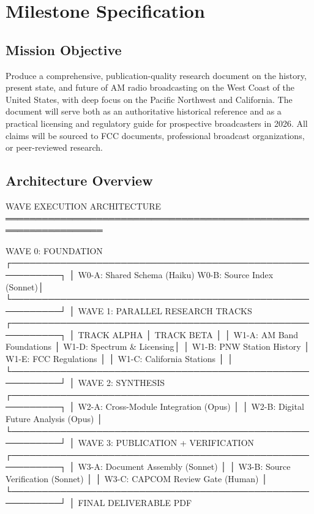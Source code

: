 \documentclass[11pt,letterpaper]{article}
\newcommand{\stageheader}[2]{%
  \noindent\colorbox{#2}{\makebox[\textwidth][l]{%
    \textcolor{white}{\bfseries\sffamily\hspace{6pt}#1\hspace{6pt}}}}%
  \vspace{0.5em}\par%
}
\begin{document}
\begin{asciibox}
\newpage

\stageheader{STAGE 3 --- MISSION PACKAGE}{tertiary}

\section{Milestone Specification}

\subsection{Mission Objective}

Produce a comprehensive, publication-quality research document on the history, present state,
and future of AM radio broadcasting on the West Coast of the United States, with deep focus on
the Pacific Northwest and California. The document will serve both as an authoritative historical
reference and as a practical licensing and regulatory guide for prospective broadcasters in 2026.
All claims will be sourced to FCC documents, professional broadcast organizations, or peer-reviewed
research.

\subsection{Architecture Overview}

\begin{asciibox}
WAVE EXECUTION ARCHITECTURE
══════════════════════════════════════════════════════════════════

  WAVE 0: FOUNDATION
  ┌──────────────────────────────────────────────────────────┐
  │  W0-A: Shared Schema (Haiku)   W0-B: Source Index (Sonnet)│
  └──────────────────────────────────────────────────────────┘
                              │
  WAVE 1: PARALLEL RESEARCH TRACKS
  ┌──────────────────────────────────────────────────────────┐
  │  TRACK ALPHA                 │  TRACK BETA               │
  │  W1-A: AM Band Foundations   │  W1-D: Spectrum & Licensing│
  │  W1-B: PNW Station History   │  W1-E: FCC Regulations    │
  │  W1-C: California Stations   │                           │
  └──────────────────────────────────────────────────────────┘
                              │
  WAVE 2: SYNTHESIS
  ┌──────────────────────────────────────────────────────────┐
  │  W2-A: Cross-Module Integration (Opus)                   │
  │  W2-B: Digital Future Analysis (Opus)                    │
  └──────────────────────────────────────────────────────────┘
                              │
  WAVE 3: PUBLICATION + VERIFICATION
  ┌──────────────────────────────────────────────────────────┐
  │  W3-A: Document Assembly (Sonnet)                        │
  │  W3-B: Source Verification (Sonnet)                      │
  │  W3-C: CAPCOM Review Gate (Human)                        │
  └──────────────────────────────────────────────────────────┘
                              │
                    FINAL DELIVERABLE PDF
\end{asciibox}


\end{asciibox}
\end{document}
